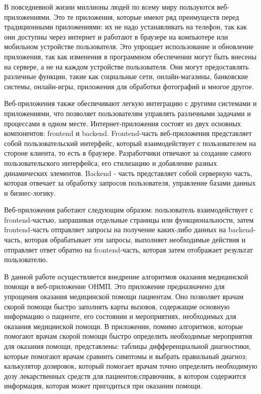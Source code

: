 \introduction %

В повседневной жизни миллионы людей по всему миру пользуются веб-приложениями. Это те приложения, которые имеют ряд преимуществ перед традиционными приложениями: их не надо устанавливать на телефон, так как они доступны через интернет и работают в браузере на компьютере или мобильном устройстве пользователя. Это упрощает использование и обновление приложения, так как изменения в программном обеспечении могут быть внесены на сервере, а не на каждом устройстве пользователя. Они могут предоставлять различные функции, такие как социальные сети, онлайн-магазины, банковские системы, онлайн-игры, приложения для обработки фотографий и многое другое.


Веб-приложения также обеспечивают легкую интеграцию с другими системами и приложениями, что позволяет пользователям управлять различными задачами и процессами в одном месте.
Интернет-приложения состоят из двух основных компонентов: frontend и backend. Frontend-часть веб-приложения представляет собой пользовательский интерфейс, который взаимодействует с пользователем на стороне клиента, то есть в браузере. Разработчики отвечают за создание самого пользовательского интерфейса, его стилизацию и добавление разных динамических элементов.  Backend - часть представляет собой серверную часть, которая отвечает за обработку запросов пользователя, управление базами данных и бизнес-логику. 


Веб-приложения работают следующим образом: пользователь взаимодействует с frontend-частью, запрашивая отдельные страницы или функциональности, затем frontend-часть отправляет запросы на получение каких-либо данных на backend-часть, которая обрабатывает эти запросы, выполняет необходимые действия и отправляет ответ обратно на frontend-часть, которая затем отображает результат пользователю.

В данной работе осуществляется внедрение алгоритмов оказания медицинской помощи в веб-приложение OНМП.  Это приложение предназначено для упрощения оказания медицинской помощи пациентам. Оно позволяет врачам скорой помощи быстро заполнять карты вызовов, содержащие основную информацию о пациенте, его состоянии и мероприятиях, необходимых для оказания медицинской помощи.
В приложении, помимо алгоритмов, которые помогают врачам скорой помощи быстро определить необходимые мероприятия для оказания помощи, представлены: таблицы дифференциальной диагностики, которые помогают врачам сравнить симптомы и выбрать правильный диагноз; калькулятор дозировок, который помогает врачам точно определить необходимую дозу лекарственных средств для пациентов;справочник, в котором содержится информация, которая может пригодиться при оказании помощи.


